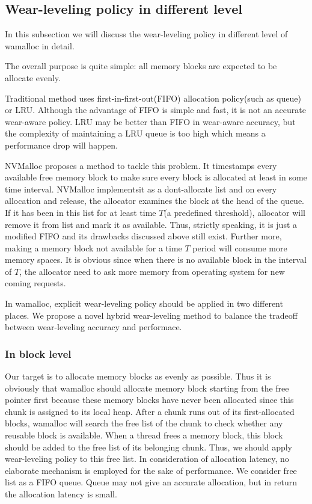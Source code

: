 \documentclass{vldb}
\begin{document}
\subsection{Wear-leveling policy in different level}

In this subsection we will discuss the wear-leveling policy in different level of wamalloc in detail.

The overall purpose is quite simple: all memory blocks are expected to be allocate evenly.

Traditional method uses first-in-first-out(FIFO) allocation policy(such as queue) or LRU\cite{zhou2009durable}\cite{rodriguez2015write}.
Although the advantage of FIFO is simple and fast, it is not an accurate wear-aware policy.
LRU may be better than FIFO in wear-aware accuracy, but the complexity of maintaining a LRU queue is too high which means a performance drop will happen.

NVMalloc\cite{moraru2013consistent} proposes a method to tackle this problem.
It timestamps every available free memory block to make sure every block is allocated at least in some time interval. NVMalloc implementsit as a dont-allocate list and on every allocation and release, the allocator examines the block at the head of the queue.
If it has been in this list for at least time $T$(a predefined threshold), allocator will remove it from list and mark it as available.
Thus, strictly speaking, it is just a modified FIFO and its drawbacks discussed above still exist.
Further more, making a memory block not available for a time $T$ period will consume more memory spaces. 
It is obvious since when there is no available block in the interval of $T$, the allocator need to ask more memory from operating system for new coming requests.

In wamalloc, explicit wear-leveling policy should be applied in two different places. 
We propose a novel hybrid wear-leveling method to balance the tradeoff between wear-leveling accuracy and performace.

\subsubsection{In block level}
Our target is to allocate memory blocks as evenly as possible.
Thus it is obviously that wamalloc should allocate memory block starting from the free pointer first
because these memory blocks have never been allocated since this chunk is assigned to its local heap.
After a chunk runs out of its first-allocated blocks, wamalloc will search the free list of the chunk to check whether any reusable block is available.
When a thread frees a memory block, this block should be added to the free list of its belonging chunk.
Thus, we should apply wear-leveling policy to this free list.
In consideration of allocation latency, no elaborate mechanism is employed for the sake of performance.
We consider free list as a FIFO queue. Queue may not give an accurate allocation, but in return the allocation latency is small.
\end{document}
